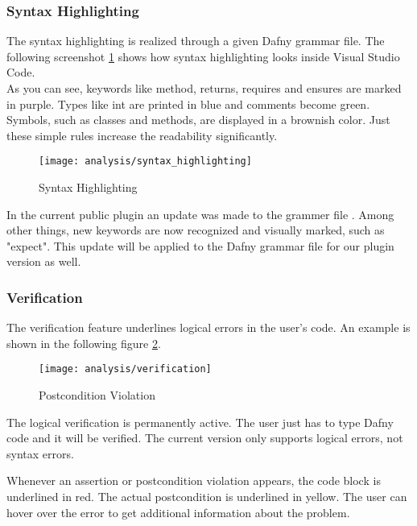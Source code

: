 \subsubsection{Syntax Highlighting}
The syntax highlighting is realized through a given Dafny grammar file.
The following screenshot \ref{fig:analysis_syntax_highlighting} shows how syntax highlighting looks inside Visual Studio Code. \\

As you can see, keywords like method, returns, requires and ensures are marked in purple. Types like int are printed in blue and comments become green. Symbols, such as classes and methods, are displayed in a brownish color. Just these simple rules increase the readability significantly.

\begin{figure}[H]
    \centering
    \texttt{[image: analysis/syntax\_highlighting]}
    \caption{Syntax Highlighting}
    \label{fig:analysis_syntax_highlighting}
\end{figure}

In the current public plugin an update was made to the grammer file \cite{syntax_update}.
Among other things, new keywords are now recognized and visually marked, such as "expect".
This update will be applied to the Dafny grammar file for our plugin version as well.

\subsubsection{Verification}
The verification feature underlines logical errors in the user's code. An example is shown in the following figure \ref{fig:analysis_verification}.

\begin{figure}[H]
    \centering
    \texttt{[image: analysis/verification]}
    \caption{Postcondition Violation}
    \label{fig:analysis_verification}
\end{figure}

The logical verification is permanently active. The user just has to type Dafny code and it will be verified. The current version only supports logical errors, not syntax errors.

Whenever an assertion or postcondition violation appears, the code block is underlined in red. The actual postcondition is underlined in yellow. The user can hover over the error to get additional information about the problem. \\

